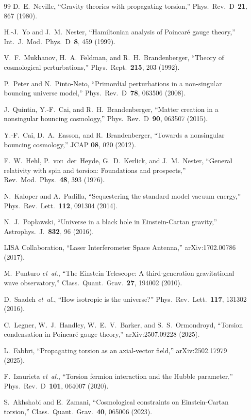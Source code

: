 \documentclass[aps,prd,twocolumn,superscriptaddress,showpacs,preprintnumbers,
  nofootinbib,longbibliography,floatfix]{revtex4-2}
\newcommand{\etal}{\textit{et~al.}}
\begin{document}
\begin{thebibliography}{99}
D.~E.~Neville,
``Gravity theories with propagating torsion,''
Phys.\ Rev.\ D~\textbf{21}, 867 (1980).

H.-J.~Yo and J.~M.~Nester,
``Hamiltonian analysis of Poincar\'e gauge theory,''
Int.\ J.\ Mod.\ Phys.\ D~\textbf{8}, 459 (1999).

V.~F.~Mukhanov, H.~A.~Feldman, and R.~H.~Brandenberger,
``Theory of cosmological perturbations,''
Phys.\ Rept.\ \textbf{215}, 203 (1992).

P.~Peter and N.~Pinto-Neto,
``Primordial perturbations in a non-singular bouncing universe model,''
Phys.\ Rev.\ D~\textbf{78}, 063506 (2008).

J.~Quintin, Y.-F.~Cai, and R.~H.~Brandenberger,
``Matter creation in a nonsingular bouncing cosmology,''
Phys.\ Rev.\ D~\textbf{90}, 063507 (2015).

Y.-F.~Cai, D.~A.~Easson, and R.~Brandenberger,
``Towards a nonsingular bouncing cosmology,''
JCAP \textbf{08}, 020 (2012).

F.~W.~Hehl, P.~von~der~Heyde, G.~D.~Kerlick, and J.~M.~Nester,
``General relativity with spin and torsion: Foundations and prospects,''
Rev.\ Mod.\ Phys.\ \textbf{48}, 393 (1976).

N.~Kaloper and A.~Padilla,
``Sequestering the standard model vacuum energy,''
Phys.\ Rev.\ Lett.\ \textbf{112}, 091304 (2014).

N.~J.~Pop\l{}awski,
``Universe in a black hole in Einstein-Cartan gravity,''
Astrophys.\ J.\ \textbf{832}, 96 (2016).

LISA Collaboration,
``Laser Interferometer Space Antenna,''
arXiv:1702.00786 (2017).

M.~Punturo \etal,
``The Einstein Telescope: A third-generation gravitational wave
observatory,''
Class.\ Quant.\ Grav.\ \textbf{27}, 194002 (2010).

D.~Saadeh \etal,
``How isotropic is the universe?''
Phys.\ Rev.\ Lett.\ \textbf{117}, 131302 (2016).

C.~Legner, W.~J.~Handley, W.~E.~V.~Barker, and S.~S.~Ormondroyd,
``Torsion condensation in Poincar\'e gauge theory,''
arXiv:2507.09228 (2025).

L.~Fabbri,
``Propagating torsion as an axial-vector field,''
arXiv:2502.17979 (2025).

F.~Izaurieta \etal,
``Torsion fermion interaction and the Hubble parameter,''
Phys.\ Rev.\ D~\textbf{101}, 064007 (2020).

S.~Akhshabi and E.~Zamani,
``Cosmological constraints on Einstein-Cartan torsion,''
Class.\ Quant.\ Grav.\ \textbf{40}, 065006 (2023).

\end{thebibliography}
\end{document}
